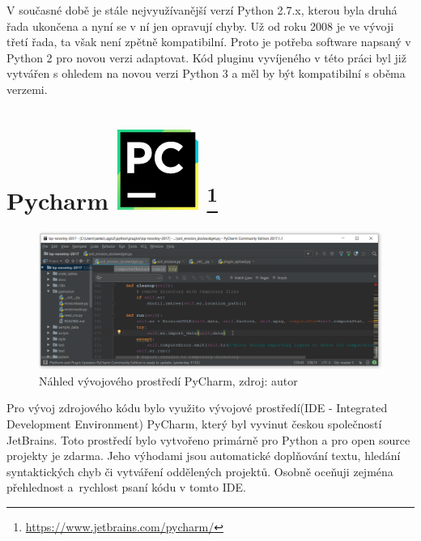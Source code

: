V současné době je stále nejvyužívanější verzí Python 2.7.x, kterou
byla druhá řada ukončena a nyní se v ní jen opravují chyby. Už od roku
2008 je ve vývoji třetí řada, ta však není zpětně kompatibilní. Proto
je potřeba software napsaný v Python 2 pro novou verzi adaptovat. Kód 
pluginu vyvíjeného v této práci byl již vytvářen s ohledem na novou 
verzi Python 3 a měl by být kompatibilní s oběma verzemi.
\cite{diveIntoPython}\cite{learningPython}

\section[PyCharm]{Pycharm \includegraphics[scale=0.2]
{./pictures/pycharm.png} \footnote{\url{https://www.jetbrains.com/pycharm/}}}
\label{pycharm}
\vspace{-10pt}
\begin{figure}[H]
    \centering \includegraphics[scale=0.45]{./pictures/pycharm_screen.png}
      \caption[Náhled vývojového prostředí PyCharm]{Náhled vývojového 
      prostředí PyCharm, zdroj: autor}
      \label{screen:pycharm}
\end{figure}
\vspace{-10pt}
Pro vývoj zdrojového kódu bylo využito vývojové prostředí(IDE - 
Integrated Development Environment)  PyCharm, který byl vyvinut 
českou společností JetBrains. Toto prostředí bylo vytvořeno primárně 
pro Python a pro open source projekty je zdarma. Jeho výhodami jsou 
automatické doplňování textu, hledání syntaktických chyb či vytváření 
oddělených projektů. Osobně oceňuji zejména přehlednost a~rychlost 
psaní kódu v tomto IDE.\cite{masteringPycharm}
